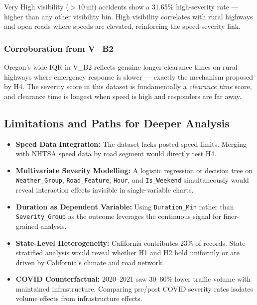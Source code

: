Very High visibility ($>10$\,mi) accidents show a 31.65\% high-severity
rate --- higher than any other visibility bin. High visibility correlates with
rural highways and open roads where speeds are elevated, reinforcing the
speed-severity link.

\subsubsection*{Corroboration from V\_B2}

Oregon's wide IQR in V\_B2 reflects genuine longer clearance times on rural
highways where emergency response is slower --- exactly the mechanism proposed
by H4. The severity score in this dataset is fundamentally a \emph{clearance
time} score, and clearance time is longest when speed is high and responders
are far away.


\subsection{Limitations and Paths for Deeper Analysis}

\begin{itemize}[noitemsep]
  \item \textbf{Speed Data Integration:} The dataset lacks posted speed limits.
        Merging with NHTSA speed data by road segment would directly test H4.

  \item \textbf{Multivariate Severity Modelling:} A logistic regression or
        decision tree on \texttt{Weather\_Group}, \texttt{Road\_Feature},
        \texttt{Hour}, and \texttt{Is\_Weekend} simultaneously would reveal
        interaction effects invisible in single-variable charts.

  \item \textbf{Duration as Dependent Variable:} Using \texttt{Duration\_Min}
        rather than \texttt{Severity\_Group} as the outcome leverages the
        continuous signal for finer-grained analysis.

  \item \textbf{State-Level Heterogeneity:} California contributes 23\% of
        records. State-stratified analysis would reveal whether H1 and H2 hold
        uniformly or are driven by California's climate and road network.

  \item \textbf{COVID Counterfactual:} 2020--2021 saw 30--60\% lower traffic
        volume with maintained infrastructure. Comparing pre/post COVID severity
        rates isolates volume effects from infrastructure effects.

\end{itemize}
